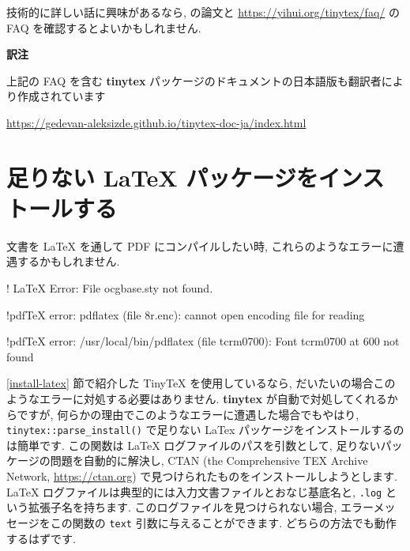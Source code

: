 \documentclass[
  11pt,
  lualatex,ja=standard,jafont=noto]{bxjsreport}
\newenvironment{Shaded}{\begin{snugshade}}{\end{snugshade}}
\newcommand{\NormalTok}[1]{#1}
\newenvironment{infobox}[1]{\begin{itemize}\renewcommand{\labelitemi}{\raisebox{-.7\height}[0pt][0pt]{%
  {\setkeys{Gin}{width=3em,keepaspectratio}\texttt{[image: \_latex/\_img/\#1]}}}}
  \setlength{\fboxsep}{1em}
  \begin{greyblock}
  \item
  }{\end{greyblock}\end{itemize}
}
\begin{document}
技術的に詳しい話に興味があるなら, \textcite{tinytex2019} の論文と \url{https://yihui.org/tinytex/faq/} の FAQ を確認するとよいかもしれません.

\begin{infobox}{memo}
\textbf{訳注}

上記の FAQ を含む \textbf{tinytex} パッケージのドキュメントの日本語版も翻訳者により作成されています

\url{https://gedevan-aleksizde.github.io/tinytex-doc-ja/index.html}

\end{infobox}

\hypertarget{install-latex-pkgs}{%
\section{足りない LaTeX パッケージをインストールする}\label{install-latex-pkgs}}

文書を LaTeX を通して PDF にコンパイルしたい時, これらのようなエラーに遭遇するかもしれません.

\begin{Shaded}
\begin{Highlighting}[]
\NormalTok{! LaTeX Error: File \textasciigrave{}ocgbase.sty\textquotesingle{} not found.}

\NormalTok{!pdfTeX error: pdflatex (file 8r.enc):}
\NormalTok{  cannot open encoding file for reading}

\NormalTok{!pdfTeX error: /usr/local/bin/pdflatex (file tcrm0700):}
\NormalTok{  Font tcrm0700 at 600 not found}
\end{Highlighting}
\end{Shaded}

\ref{install-latex} 節で紹介した TinyTeX を使用しているなら, だいたいの場合このようなエラーに対処する必要はありません. \textbf{tinytex} \autocite{R-tinytex} が自動で対処してくれるからですが, 何らかの理由でこのようなエラーに遭遇した場合でもやはり, \texttt{tinytex::parse\_install()} で足りない LaTex パッケージをインストールするのは簡単です. この関数は LaTeX ログファイルのパスを引数として, 足りないパッケージの問題を自動的に解決し, CTAN (the Comprehensive TEX Archive Network, \url{https://ctan.org}) で見つけられたものをインストールしようとします. LaTeX ログファイルは典型的には入力文書ファイルとおなじ基底名と, \texttt{.log} という拡張子名を持ちます. このログファイルを見つけられない場合, エラーメッセージをこの関数の \texttt{text} 引数に与えることができます. どちらの方法でも動作するはずです.
\end{document}
